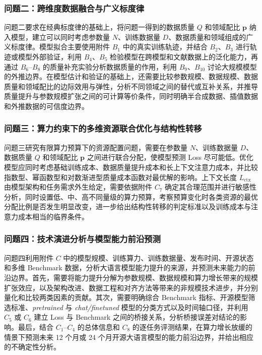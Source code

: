 \subsubsection{问题二：跨维度数据融合与广义标度律}

问题二要求在经典标度律的基础上，将问题一得到的数据质量 $Q$ 和领域配比 $\boldsymbol{p}$ 纳入模型，建立可以同时考虑参数量 $N$、训练数据量 $D$、数据质量和领域组成的广义标度律。模型拟合主要使用附件 $B_1$ 中的真实训练轨迹，并结合 $B_2$、$B_3$ 进行轨迹或模型外部验证，利用 $B_4$、$B_5$ 检验模型在跨模型和文献数据上的泛化能力，再通过 $B_6$--$B_8$ 的质量补充实验分析数据质量的作用，利用 $B_9$、$B_{10}$ 讨论大规模模型的外推边界。在模型估计和验证的基础上，还需要比较参数规模、数据规模、数据质量和领域配比的边际效用与弹性，分析不同领域之间的替代或互补关系，并推导质量提升与参数规模扩张之间的可计算等价条件，同时明确半合成数据、插值数据和外推数据的可信度边界。

\subsubsection{问题三：算力约束下的多维资源联合优化与结构性转移}

问题三研究有限算力预算下的资源配置问题，需要在参数量 $N$、训练数据量 $D$、数据质量 $Q$ 和领域配比 $\boldsymbol{p}$ 之间进行联合分配，使模型预测 Loss 尽可能低。优化模型应同时考虑基础训练成本、数据质量提升成本和长上下文注意力成本，并比较指数型、幂函数型和对数渐进型质量成本函数对最优解的影响。上下文长度 $L_{\mathrm{ctx}}$ 由模型架构和任务需求外生给定，需要依据附件 $C_7$ 确定其合理范围并进行敏感性分析，同时设置低、中、高不同量级的算力预算，考察预算变化时各类资源的最优分配比例是否发生明显改变，进一步给出结构性转移的判定标准以及训练成本与注意力成本相当的临界条件。

\subsubsection{问题四：技术演进分析与模型能力前沿预测}

问题四利用附件 $C$ 中的模型规模、训练算力、训练数据量、发布时间、开源状态和多维 Benchmark 数据，分析大语言模型能力提升的来源，并预测未来能力的前沿边界。首先，需要将能力提升分解为参数规模、数据规模和算力增长带来的规模扩张效应，以及架构改进、数据工程和对齐方法等带来的非规模技术进步，并分别量化和比较两类因素的贡献。其次，需要明确综合 Benchmark 指标、开源模型筛选标准、\emph{pretrained} 与 \emph{chat/finetuned} 模型的分类方式以及时间轴口径，并利用 $C_5$ 或 $C_6$ 建立 Loss 与 Benchmark 之间的桥接关系，分析桥接误差对结论的影响。最后，结合 $C_1$--$C_4$ 的总体信息和 $C_8$ 的逐任务评测结果，在算力增长放缓的情景下预测未来 12 个月或 24 个月开源大语言模型的能力前沿边界，并给出相应的不确定性分析。

